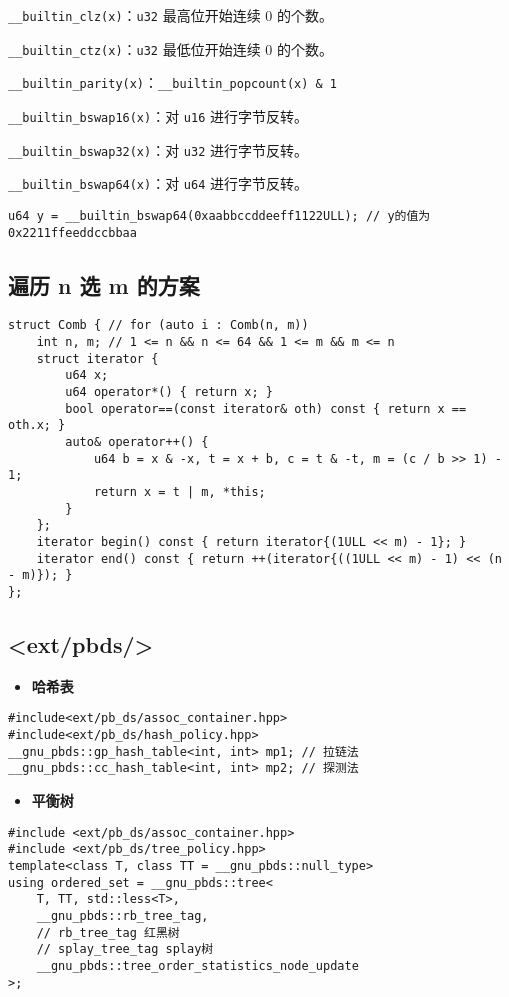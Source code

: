 \documentclass[a4paper,landscape,twocolumn]{ctexart}
\newcommand{\point}[1]{
	\begin{itemize}
		\item \textbf{#1}
	\end{itemize}
}
\begin{document}
\texttt{\_\_builtin\_clz{\color{red}{ll}}(x)}：\texttt{u32{\color{red}{/u64}}} 最高位开始连续 $0$ 的个数。

\texttt{\_\_builtin\_ctz{\color{red}{ll}}(x)}：\texttt{u32{\color{red}{/u64}}} 最低位开始连续 $0$ 的个数。

\texttt{\_\_builtin\_parity{\color{red}{ll}}(x)}：\texttt{\_\_builtin\_popcount{\color{red}{ll}}(x) \& 1}

\texttt{\_\_builtin\_bswap16(x)}：对 \texttt{u16} 进行字节反转。

\texttt{\_\_builtin\_bswap32(x)}：对 \texttt{u32} 进行字节反转。

\texttt{\_\_builtin\_bswap64(x)}：对 \texttt{u64} 进行字节反转。

\begin{lstlisting}
u64 y = __builtin_bswap64(0xaabbccddeeff1122ULL); // y的值为0x2211ffeeddccbbaa
\end{lstlisting}

\subsection{遍历 n 选 m 的方案}

\begin{lstlisting}
struct Comb { // for (auto i : Comb(n, m))
	int n, m; // 1 <= n && n <= 64 && 1 <= m && m <= n
	struct iterator {
		u64 x;
		u64 operator*() { return x; }
		bool operator==(const iterator& oth) const { return x == oth.x; }
		auto& operator++() {
			u64 b = x & -x, t = x + b, c = t & -t, m = (c / b >> 1) - 1;
			return x = t | m, *this;
		}
	};
	iterator begin() const { return iterator{(1ULL << m) - 1}; }
	iterator end() const { return ++(iterator{((1ULL << m) - 1) << (n - m)}); }
};
\end{lstlisting}

\subsection{<ext/pbds/>}

\point{哈希表}

\begin{lstlisting}
#include<ext/pb_ds/assoc_container.hpp>
#include<ext/pb_ds/hash_policy.hpp>
__gnu_pbds::gp_hash_table<int, int> mp1; // 拉链法
__gnu_pbds::cc_hash_table<int, int> mp2; // 探测法
\end{lstlisting}

\point{平衡树}

\begin{lstlisting}
#include <ext/pb_ds/assoc_container.hpp>
#include <ext/pb_ds/tree_policy.hpp>
template<class T, class TT = __gnu_pbds::null_type>
using ordered_set = __gnu_pbds::tree<
	T, TT, std::less<T>,
	__gnu_pbds::rb_tree_tag,
	// rb_tree_tag 红黑树
	// splay_tree_tag splay树
	__gnu_pbds::tree_order_statistics_node_update
>;
\end{lstlisting}
\end{document}
